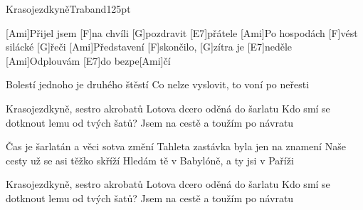 \begin{song}{Krasojezdkyně}{Traband}{125pt}

%
[Ami]Přijel jsem [F]na chvíli [G]pozdravit [E7]přátele
[Ami]Po hospodách [F]vést silácké [G]{}řeči
[Ami]Představení [F]skončilo, [G]zítra je [E7]neděle
[Ami]Odplouvám [E7]do bezpe[Ami]{}čí

Bolestí jednoho je druhého štěstí
Co nelze vyslovit, to voní po neřesti

\chorus%
Krasojezdkyně, sestro akrobatů
Lotova dcero oděná do šarlatu
Kdo smí se dotknout lemu od tvých šatů?
Jsem na cestě a toužím po návratu

%
Čas je šarlatán a věci sotva změní
Tahleta zastávka byla jen na znamení
Naše cesty už se asi těžko skříží
Hledám tě v Babylóně, a ty jsi v Paříži

\chorus%
Krasojezdkyně, sestro akrobatů
Lotova dcero oděná do šarlatu
Kdo smí se dotknout lemu od tvých šatů?
Jsem na cestě a toužím po návratu
\end{song}
